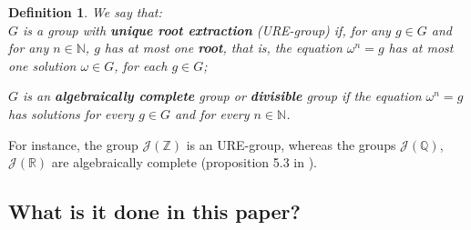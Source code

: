 \documentclass[preprint,12pt]{elsarticle}
\newtheorem{defi}{Definition}
\begin{document}
\begin{defi}
We say that: \\

$G$ is  a group with \textbf{unique root extraction} (URE-group) if,  for any $g\in G$ and for any $n\in\mathbb N$, $g$ has at most one \textbf{root}, that is, the equation $\omega^n=g$ has at most one solution $\omega\in  G$, for each $g\in G$; \bigskip


$G$ is an \textbf{algebraically complete} group or \textbf{divisible} group if the equation $\omega^n=g$ has solutions for every $g\in G$  and for every $n\in\mathbb N$.
\end{defi}
\medskip

For instance, the group $\mathcal J(\mathbb Z)$ is an URE-group, whereas the groups $\mathcal J(\mathbb Q)$, $\mathcal J(\mathbb R)$ are algebraically complete (proposition 5.3 in \cite{B}). 

\subsection{What is it done in this paper?}




\medskip






\end{document}
